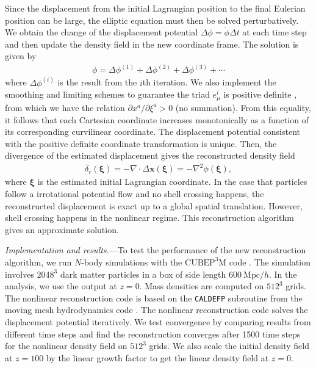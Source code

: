 \documentclass[aps,prl,twocolumn,showpacs,superscriptaddress,groupedaddress,nofootinbib]{revtex4}  %
\newcommand{\mr}{\mathrm}
\newcommand{\bea}{\begin{eqnarray}}
\newcommand{\eea}{\end{eqnarray}}
\begin{document}
Since the displacement from the initial Lagrangian position to the final 
Eulerian position can be large, the elliptic equation must then be solved 
perturbatively. We obtain the change of the displacement potential 
$\Delta\phi=\dot{\phi}\Delta t$ at each time step and then update the density
field in the new coordinate frame.  
The solution is given by 
\bea
\phi=\Delta\phi^{(1)}+\Delta\phi^{(2)}+\Delta\phi^{(3)}+\cdots
\eea
where $\Delta\phi^{(i)}$ is the result from the $i$th iteration. 
We also implement the smoothing and limiting schemes to guarantee the triad 
$e^i_\mu$ is positive definite \cite{1995ApJS..100..269P,1998ApJS..115...19P},
from which we have the relation $\partial x^a/\partial\xi^a>0$ (no summation).
From this equality, it follows that each Cartesian coordinate increases monotonically as a function of its corresponding curvilinear coordinate.
The displacement potential consistent with the
positive definite coordinate transformation is unique.
Then, the divergence of the estimated displacement gives the 
reconstructed density field 
\bea
\delta_r(\bm{\xi})=-\nabla\cdot\Delta\bm{x}(\bm{\xi})
=-\nabla^2\phi(\bm{\xi}),
\eea
where $\bm{\xi}$ is the estimated initial Lagrangian coordinate.
In the case that particles follow a irrotational potential flow and no shell
crossing happens, the reconstructed displacement is exact up to a global 
spatial translation.
However, shell crossing happens in the nonlinear regime. This reconstruction
algorithm gives an approximate solution.


{\it Implementation and results.}---To test the performance of 
the new reconstruction algorithm, we run $N$-body simulations with 
the $\mr{CUBEP}^3\mr{M}$ code \cite{2013code}.
The simulation involves $2048^3$ dark matter particles in a box of 
side length $600\ \mr{Mpc}/h$.
In the analysis, we use the output at $z=0$. Mass densities are computed
on $512^3$ grids. 
The nonlinear reconstruction code is based on the {\tt CALDEFP} subroutine from 
the moving mesh hydrodynamics code \cite{1998ApJS..115...19P}.
The nonlinear reconstruction code solves the displacement potential iteratively.
We test convergence by comparing results from different time steps and 
find the reconstruction converges after 1500 time steps for the nonlinear 
density field on $512^3$ grids.
We also scale the initial density field at $z=100$ by the linear growth factor
to get the linear density field at $z=0$.
\end{document}

